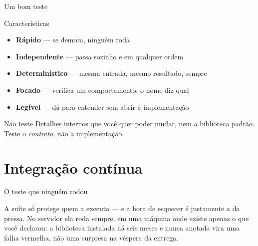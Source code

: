 \documentclass[aspectratio=169]{beamer}
\begin{document}
\begin{frame}{Um bom teste}
  \begin{block}{Características}
    \begin{itemize}
      \item \textbf{Rápido} --- se demora, ninguém roda
      \item \textbf{Independente} --- passa sozinho e em qualquer ordem
      \item \textbf{Determinístico} --- mesma entrada, mesmo resultado, sempre
      \item \textbf{Focado} --- verifica um comportamento; o nome diz qual
      \item \textbf{Legível} --- dá para entender sem abrir a implementação
    \end{itemize}
  \end{block}
  \begin{alertblock}{Não teste}
    Detalhes internos que você quer poder mudar, nem a biblioteca padrão.
    Teste o \emph{contrato}, não a implementação.
  \end{alertblock}
\end{frame}

\section{Integração contínua}

\begin{frame}{O teste que ninguém rodou}
  \begin{center}
  \end{center}
  \vspace{0.6em}
  \small A suíte só protege quem a executa --- e a hora de esquecer é
  justamente a da pressa. No servidor ela roda sempre, em uma máquina
  onde existe apenas o que você declarou: a biblioteca instalada há seis
  meses e nunca anotada vira uma falha vermelha, não uma surpresa na
  véspera da entrega.
\end{frame}
\end{document}
